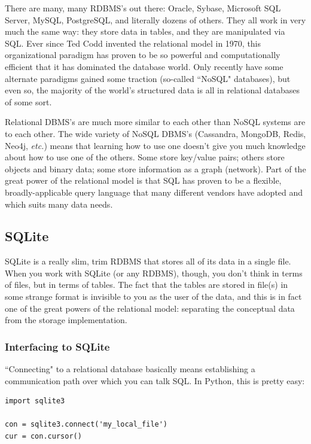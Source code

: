 \documentclass[12pt]{article}
\begin{document}
There are many, many RDBMS's out there: Oracle, Sybase, Microsoft SQL Server,
MySQL, PostgreSQL, and literally dozens of others. They all work in very much
the same way: they store data in tables, and they are manipulated via SQL.
Ever since Ted Codd invented the relational model in 1970, this organizational
paradigm has proven to be so powerful and computationally efficient that it
has dominated the database world. Only recently have some alternate paradigms
gained some traction (so-called ``NoSQL" databases), but even so, the majority
of the world's structured data is all in relational databases of some sort.

Relational DBMS's are much more similar to each other than NoSQL systems are
to each other. The wide variety of NoSQL DBMS's (Cassandra, MongoDB, Redis,
Neo4j, \textit{etc.}) means that learning how to use one doesn't give you much
knowledge about how to use one of the others. Some store key/value pairs;
others store objects and binary data; some store information as a graph
(network). Part of the great power of the relational model is that SQL has
proven to be a flexible, broadly-applicable query language that many different
vendors have adopted and which suits many data needs.

\subsection{SQLite}

SQLite is a really slim, trim RDBMS that stores all of its data in a single
file. When you work with SQLite (or any RDBMS), though, you don't think in
terms of files, but in terms of tables. The fact that the tables are stored in
file(s) in some strange format is invisible to you as the user of the data,
and this is in fact one of the great powers of the relational model:
separating the conceptual data from the storage implementation.

\subsubsection{Interfacing to SQLite}

``Connecting" to a relational database basically means establishing a
communication path over which you can talk SQL. In Python, this is pretty
easy:

\begin{Verbatim}[fontsize=small,samepage=true,frame=none]
import sqlite3

con = sqlite3.connect('my_local_file')
cur = con.cursor()
\end{Verbatim}
\end{document}
